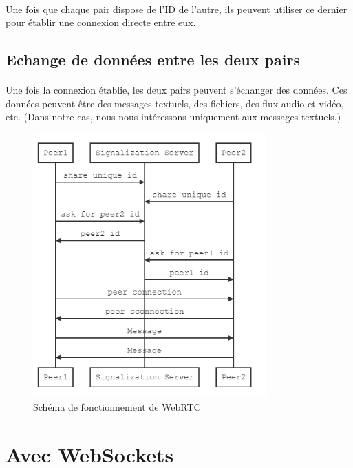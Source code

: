 \paragraph{}
Une fois que chaque pair dispose de l'ID de l'autre, ils peuvent utiliser ce dernier pour établir une connexion directe entre eux. 

\subsection{Echange de données entre les deux pairs}

\paragraph{}
Une fois la connexion établie, les deux pairs peuvent s'échanger des données. Ces données peuvent être des messages textuels, des fichiers, des flux audio et vidéo, etc. 
(Dans notre cas, nous nous intéressons uniquement aux messages textuels.)


\begin{figure}[h]
    \centering
    \includegraphics[width=0.8\textwidth]{assets/webrtc_connection.png}
    \caption{Schéma de fonctionnement de WebRTC}
    \label{fig:webrtc}
\end{figure}

\newpage 

\section{Avec WebSockets}

